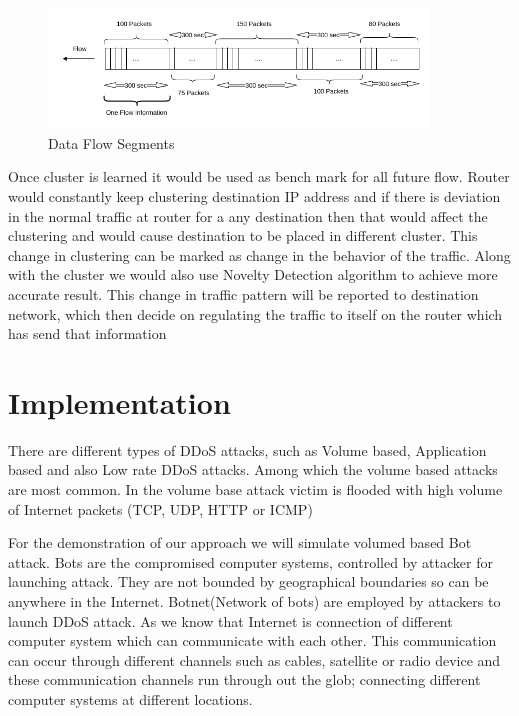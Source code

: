 \documentclass[10pt,oneside,a4paper]{article}
\begin{document}
\begin{figure}[H]
\centering
\includegraphics[width=0.90\textwidth]{Data_Flow_Capture}
\caption{Data Flow Segments} \label{fig:flow}
\end{figure}


Once cluster is learned it would be used as bench mark for all future flow. Router would constantly keep clustering destination IP address and if there is deviation in the normal traffic at router for a any destination then that would affect the clustering and would cause destination to be placed in different cluster. This change in clustering can be marked as change in the behavior of the traffic. Along with the cluster we would also use Novelty Detection algorithm to achieve more accurate result. This change in traffic pattern will be reported to destination network, which then decide on regulating the traffic to itself on the router which has send that information\par

\section{Implementation}

There are different types of DDoS attacks, such as Volume based, Application based and also Low rate DDoS attacks. Among which the volume based attacks are most common. In the volume base attack victim is flooded with high volume of Internet packets (TCP, UDP, HTTP or ICMP)

For the demonstration of our approach we will simulate volumed based Bot attack. Bots are the compromised computer systems, controlled by attacker for launching attack. They are not bounded by geographical boundaries so can be anywhere in the Internet. Botnet(Network  of bots) are employed by attackers to launch DDoS attack. As we know that Internet is connection of different computer system which can communicate with each other. This communication can occur through different channels such as cables, satellite or radio device and these communication channels run through out the glob; connecting different computer systems at different locations.
\end{document}

